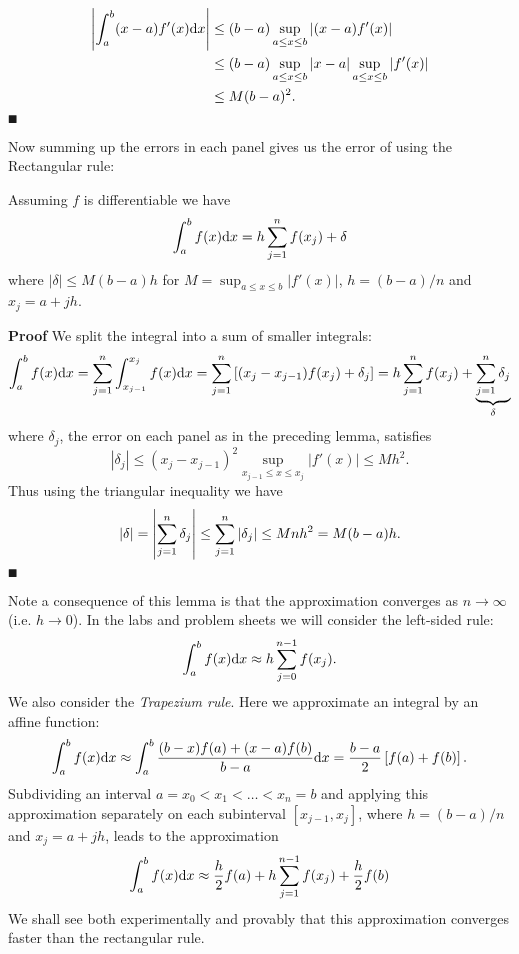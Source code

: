 \begin{align*}
\left|{\int_a^b (x-a) f'(x) {\rm d} x}\right| &\leq (b-a) \sup_{a \leq x \leq b}|(x-a) f'(x)|  \\
&\leq (b-a) \sup_{a \leq x \leq b}|x-a| \sup_{a \leq x \leq b}|f'(x)|\\
&\leq M (b-a)^2.
\end{align*}
\ensuremath{\QED}

Now summing up the errors in each panel gives us the error of using the Rectangular rule:

\begin{theorem} Assuming $f$ is differentiable we have
\[
\ensuremath{\int}_a^b f(x) {\rm d}x =  h \ensuremath{\sum}_{j=1}^n f(x_j) +  \ensuremath{\delta}
\]
where $|\ensuremath{\delta}| \ensuremath{\leq} M (b-a) h$ for $M = \sup_{a \ensuremath{\leq} x \ensuremath{\leq} b}|f'(x)|$, $h = (b-a)/n$ and $x_j = a + jh$.

\end{theorem}
\textbf{Proof} We split the integral into a sum of smaller integrals:
\[
\ensuremath{\int}_a^b f(x) {\rm d}x = \ensuremath{\sum}_{j=1}^n  \ensuremath{\int}_{x_{j-1}}^{x_j} f(x) {\rm d}x =
\ensuremath{\sum}_{j=1}^n  \br[(x_j - x_{j-1}) f(x_j) + \ensuremath{\delta}_j] =  h \ensuremath{\sum}_{j=1}^n f(x_j) +  \underbrace{\ensuremath{\sum}_{j=1}^n \ensuremath{\delta}_j}_\ensuremath{\delta}
\]
where $\ensuremath{\delta}_j$, the error on each panel as in the preceding lemma, satisfies
\[
|\ensuremath{\delta}_j| \ensuremath{\leq} (x_j-x_{j-1})^2 \sup_{x_{j-1} \ensuremath{\leq} x \ensuremath{\leq} x_j}|f'(x)| \ensuremath{\leq} M h^2.
\]
Thus using the triangular inequality we have
\[
|\delta| = \left|{ \sum_{j=1}^n \delta_j}\right| \leq \sum_{j=1}^n |\delta_j| \leq M n h^2 = M(b-a)h.
\]
\ensuremath{\QED}

Note a consequence of this lemma is that the approximation converges as $n \ensuremath{\rightarrow} \ensuremath{\infty}$ (i.e. $h \ensuremath{\rightarrow} 0$). In the labs and problem sheets we will consider the left-sided rule:
\[
\ensuremath{\int}_a^b f(x) {\rm d}x \ensuremath{\approx}  h \ensuremath{\sum}_{j=0}^{n-1} f(x_j).
\]
We also consider the \emph{Trapezium rule}. Here we approximate an integral  by an affine function:
\[
\ensuremath{\int}_a^b f(x) {\rm d} x \ensuremath{\approx} \ensuremath{\int}_a^b {(b-x)f(a) + (x-a)f(b) \over b-a} \dx
= {b-a \over 2} \br[f(a) + f(b)].
\]
Subdividing an interval $a = x_0 < x_1 < \ensuremath{\ldots} < x_n = b$ and applying this approximation separately on each subinterval $[x_{j-1},x_j]$, where $h = (b-a)/n$ and $x_j = a + jh$, leads to the approximation
\[
\ensuremath{\int}_a^b f(x) {\rm d}x \ensuremath{\approx}  {h \over 2} f(a) + h \ensuremath{\sum}_{j=1}^{n-1} f(x_j) + {h \over 2} f(b)
\]
We shall see both experimentally and provably that this approximation converges faster than the rectangular rule.



